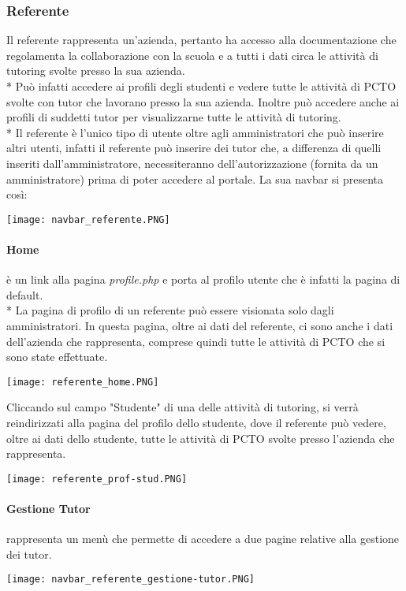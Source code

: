 \documentclass[12pt]{article}
\begin{document}
\newpage
\subsubsection{Referente}
Il referente rappresenta un'azienda, pertanto ha accesso alla documentazione che regolamenta la collaborazione con la scuola e a tutti i dati circa le attività di tutoring svolte presso la sua azienda.\\*
Può infatti accedere ai profili degli studenti e vedere tutte le attività di PCTO svolte con tutor che lavorano presso la sua azienda. Inoltre può accedere anche ai profili di suddetti tutor per visualizzarne tutte le attività di tutoring.\\*
Il referente è l'unico tipo di utente oltre agli amministratori che può inserire altri utenti, infatti il referente può inserire dei tutor che, a differenza di quelli inseriti dall'amministratore, necessiteranno dell'autorizzazione (fornita da un amministratore) prima di poter accedere al portale.
La sua navbar si presenta così:
\begin{center}
    \texttt{[image: navbar\_referente.PNG]}
\end{center}
\bigskip

\paragraph{Home} è un link alla pagina \textit{profile.php} e porta al profilo utente che è infatti la pagina di default.\\*
La pagina di profilo di un referente può essere visionata solo dagli amministratori. In questa pagina, oltre ai dati del referente, ci sono anche i dati dell'azienda che rappresenta, comprese quindi tutte le attività di PCTO che si sono state effettuate.
\begin{center}
    \texttt{[image: referente\_home.PNG]}
\end{center}
Cliccando sul campo "Studente" di una delle attività di tutoring, si verrà reindirizzati alla pagina del profilo dello studente, dove il referente può vedere, oltre ai dati dello studente, tutte le attività di PCTO svolte presso l'azienda che rappresenta.
\begin{center}
    \texttt{[image: referente\_prof-stud.PNG]}
\end{center}
\bigskip

\paragraph{Gestione Tutor} rappresenta un menù che permette di accedere a due pagine relative alla gestione dei tutor.
\begin{center}
    \texttt{[image: navbar\_referente\_gestione-tutor.PNG]}
\end{center}
\end{document}
